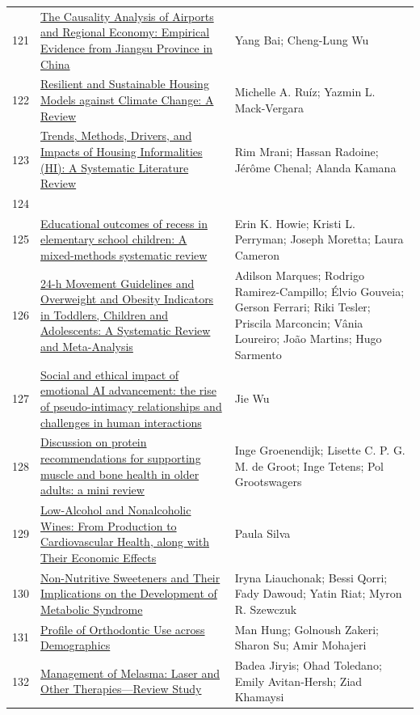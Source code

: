 \documentclass[11pt]{article}
\begin{document}
\begin{longtable}{cp{8cm}p{5cm}}
  121 & \href{https://www.mdpi.com/2071-1050/14/7/4295}{The Causality Analysis of Airports and Regional Economy: Empirical Evidence from Jiangsu Province in China} & Yang Bai; Cheng-Lung Wu \\
  122 & \href{https://www.mdpi.com/2071-1050/15/18/13544}{Resilient and Sustainable Housing Models against Climate Change: A Review} & Michelle A. Ruíz; Yazmin L. Mack-Vergara \\
  123 & \href{https://www.mdpi.com/2413-8851/9/4/101}{Trends, Methods, Drivers, and Impacts of Housing Informalities (HI): A Systematic Literature Review} & Rim Mrani; Hassan Radoine; Jérôme Chenal; Alanda Kamana \\
  124 &  &  \\
  125 & \href{https://journals.plos.org/plosone/article?id=10.1371/journal.pone.0294340}{Educational outcomes of recess in elementary school children: A mixed-methods systematic review} & Erin K. Howie; Kristi L. Perryman; Joseph Moretta; Laura Cameron \\
  126 & \href{https://pubmed.ncbi.nlm.nih.gov/37184735/}{24-h Movement Guidelines and Overweight and Obesity Indicators in Toddlers, Children and Adolescents: A Systematic Review and Meta-Analysis} & Adilson Marques; Rodrigo Ramirez-Campillo; Élvio Gouveia; Gerson Ferrari; Riki Tesler; Priscila Marconcin; Vânia Loureiro; João Martins; Hugo Sarmento \\
  127 & \href{https://www.frontiersin.org/journals/psychology/articles/10.3389/fpsyg.2024.1410462/full}{Social and ethical impact of emotional AI advancement: the rise of pseudo-intimacy relationships and challenges in human interactions} & Jie Wu \\
  128 & \href{https://pubmed.ncbi.nlm.nih.gov/38840697/}{Discussion on protein recommendations for supporting muscle and bone health in older adults: a mini review} & Inge Groenendijk; Lisette C. P. G. M. de Groot; Inge Tetens; Pol Grootswagers \\
  129 & \href{https://www.mdpi.com/2306-5710/10/3/49}{Low-Alcohol and Nonalcoholic Wines: From Production to Cardiovascular Health, along with Their Economic Effects} & Paula Silva \\
  130 & \href{https://pubmed.ncbi.nlm.nih.gov/30884834/}{Non-Nutritive Sweeteners and Their Implications on the Development of Metabolic Syndrome} & Iryna Liauchonak; Bessi Qorri; Fady Dawoud; Yatin Riat; Myron R. Szewczuk \\
  131 & \href{https://pubmed.ncbi.nlm.nih.gov/38132429/}{Profile of Orthodontic Use across Demographics} & Man Hung; Golnoush Zakeri; Sharon Su; Amir Mohajeri \\
  132 & \href{https://pubmed.ncbi.nlm.nih.gov/38592701/}{Management of Melasma: Laser and Other Therapies—Review Study} & Badea Jiryis; Ohad Toledano; Emily Avitan-Hersh; Ziad Khamaysi \\
\end{longtable}
\end{document}
